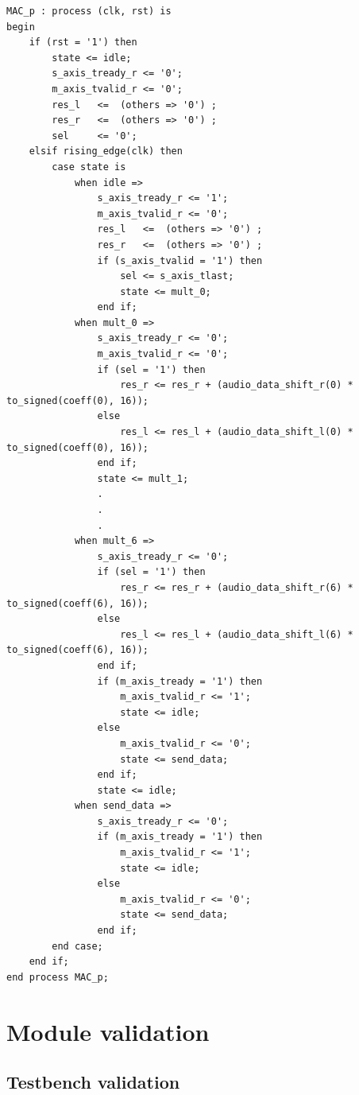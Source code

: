\documentclass[11pt, a4paper]{article}
\begin{document}
\begin{lstlisting}[style={VHDL-style}]
MAC_p : process (clk, rst) is
begin
    if (rst = '1') then
        state <= idle;
        s_axis_tready_r <= '0';
        m_axis_tvalid_r <= '0';
        res_l   <=  (others => '0') ;
        res_r   <=  (others => '0') ;
        sel     <= '0';
    elsif rising_edge(clk) then
        case state is
            when idle =>
                s_axis_tready_r <= '1';
                m_axis_tvalid_r <= '0';
                res_l   <=  (others => '0') ;
                res_r   <=  (others => '0') ;
                if (s_axis_tvalid = '1') then
                    sel <= s_axis_tlast;
                    state <= mult_0;
                end if;
            when mult_0 =>
                s_axis_tready_r <= '0';
                m_axis_tvalid_r <= '0';
                if (sel = '1') then
                    res_r <= res_r + (audio_data_shift_r(0) * to_signed(coeff(0), 16));
                else
                    res_l <= res_l + (audio_data_shift_l(0) * to_signed(coeff(0), 16));
                end if;
                state <= mult_1;
                .
                .
                .
            when mult_6 =>
                s_axis_tready_r <= '0';
                if (sel = '1') then
                    res_r <= res_r + (audio_data_shift_r(6) * to_signed(coeff(6), 16));
                else
                    res_l <= res_l + (audio_data_shift_l(6) * to_signed(coeff(6), 16));
                end if;
                if (m_axis_tready = '1') then
                    m_axis_tvalid_r <= '1';
                    state <= idle;
                else
                    m_axis_tvalid_r <= '0';
                    state <= send_data;
                end if;
                state <= idle;
            when send_data =>
                s_axis_tready_r <= '0';
                if (m_axis_tready = '1') then
                    m_axis_tvalid_r <= '1';
                    state <= idle;
                else
                    m_axis_tvalid_r <= '0';
                    state <= send_data;
                end if;
        end case;
    end if;
end process MAC_p;
\end{lstlisting}



\section{Module validation}

\subsection{Testbench validation}
\end{document}
